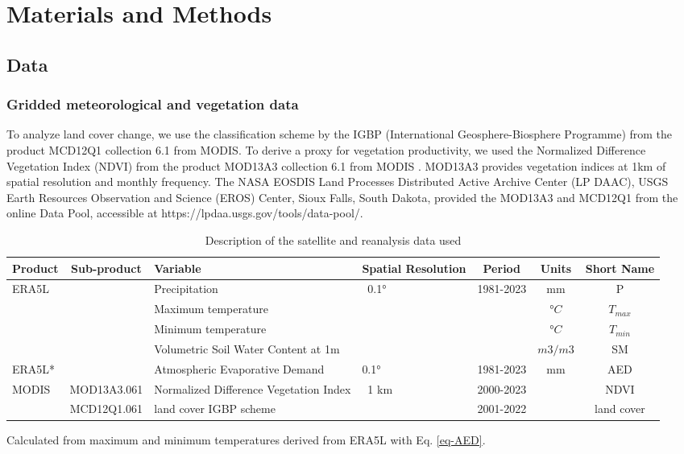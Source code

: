 \documentclass[
  authoryear,
  preprint,
  3p,
  onecolumn]{elsarticle}
\begin{document}
\hypertarget{materials-and-methods}{%
\section{Materials and Methods}\label{materials-and-methods}}

\hypertarget{data}{%
\subsection{Data}\label{data}}

\hypertarget{gridded-meteorological-and-vegetation-data}{%
\subsubsection{Gridded meteorological and vegetation
data}\label{gridded-meteorological-and-vegetation-data}}

To analyze land cover change, we use the classification scheme by the
IGBP (International Geosphere-Biosphere Programme) from the product
MCD12Q1 collection 6.1 from MODIS. To derive a proxy for vegetation
productivity, we used the Normalized Difference Vegetation Index (NDVI)
from the product MOD13A3 collection 6.1 from MODIS \citep{Didan2015}.
MOD13A3 provides vegetation indices at 1km of spatial resolution and
monthly frequency. The NASA EOSDIS Land Processes Distributed Active
Archive Center (LP DAAC), USGS Earth Resources Observation and Science
(EROS) Center, Sioux Falls, South Dakota, provided the MOD13A3 and
MCD12Q1 from the online Data Pool, accessible at
https://lpdaa.usgs.gov/tools/data-pool/.

\begin{table}[!ht]
\caption{Description of the satellite and reanalysis data used}
\label{tab-desEOD}
\small
\centering
\begin{tabular}{p{}cp{}p{}ccc}
\hline
\multirow{1}{*}{\centering Product} & Sub-product & Variable & Spatial Resolution  & Period & Units & Short Name \\ 
\hline
\multirow{4}{*}{ERA5L} & ~ & Precipitation & \multirow{4}{*}{~0.1°} & \multirow{4}{*}{1981-2023} & mm & P \\ 
         &  & Maximum temperature & ~ & & $°C$ & $T_{max}$ \\ 
         &  & Minimum temperature & ~ & & $°C$ & $T_{min}$ \\ 
         &  & Volumetric Soil Water Content at 1m & ~ & & $m3/m3$ & SM \\ 
ERA5L* & & Atmospheric Evaporative Demand & 0.1° & 1981-2023 & mm & AED \\
        \multirow{2}{*}{MODIS} & MOD13A3.061 & Normalized Difference Vegetation Index & \multirow{2}{*}{~1 km} & 2000-2023 & ~ & NDVI \\ 
         & MCD12Q1.061 & land cover IGBP scheme & & 2001-2022 & ~ & land cover \\ 
\hline
\end{tabular}
{\raggedright *Calculated from maximum and minimum temperatures derived from ERA5L with Eq. \ref{eq-AED}. \par}
\end{table}
\end{document}
